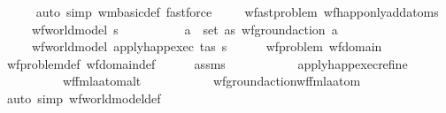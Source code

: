 \begin{isabellebody}
\ \ \ \ \isamarkupfalse%
\ {\isacharparenleft}{\kern0pt}auto\ simp{\isacharcolon}{\kern0pt}\ wm{\isacharunderscore}{\kern0pt}basic{\isacharunderscore}{\kern0pt}def{\isacharparenright}{\kern0pt}\ fastforce%
\endisatagproof
{\isafoldproof}%
%
\isadelimproof
\isanewline
%
\endisadelimproof
\isanewline
\ \ \isamarkupfalse%
\ {\isacharparenleft}{\kern0pt}\ wf{\isacharunderscore}{\kern0pt}ast{\isacharunderscore}{\kern0pt}problem{\isacharparenright}{\kern0pt}\ wf{\isacharunderscore}{\kern0pt}happ{\isacharunderscore}{\kern0pt}only{\isacharunderscore}{\kern0pt}add{\isacharunderscore}{\kern0pt}atoms{\isacharprime}{\kern0pt}{\isacharcolon}{\kern0pt}\isanewline
\ \ \ \ \ {\isachardoublequoteopen}wf{\isacharunderscore}{\kern0pt}world{\isacharunderscore}{\kern0pt}model\ s{\isachardoublequoteclose}\ \isanewline
\ \ \ \ \ \ \ \ \ {\isachardoublequoteopen}{\isasymforall}a\ {\isasymin}\ set\ as{\isachardot}{\kern0pt}\ wf{\isacharunderscore}{\kern0pt}ground{\isacharunderscore}{\kern0pt}action\ a{\isachardoublequoteclose}\isanewline
\ \ \ \ \ {\isachardoublequoteopen}wf{\isacharunderscore}{\kern0pt}world{\isacharunderscore}{\kern0pt}model\ {\isacharparenleft}{\kern0pt}apply{\isacharunderscore}{\kern0pt}happ{\isacharunderscore}{\kern0pt}exec\ {\isacharparenleft}{\kern0pt}t{\isacharcomma}{\kern0pt}as{\isacharparenright}{\kern0pt}\ s{\isacharparenright}{\kern0pt}{\isachardoublequoteclose}\isanewline
%
\isadelimproof
\ \ \ \ %
\endisadelimproof
%
\isatagproof
{}\isamarkupfalse%
\ wf{\isacharunderscore}{\kern0pt}problem\ wf{\isacharunderscore}{\kern0pt}domain\isanewline
\ \ \ \ \isamarkupfalse%
\ wf{\isacharunderscore}{\kern0pt}problem{\isacharunderscore}{\kern0pt}def\ wf{\isacharunderscore}{\kern0pt}domain{\isacharunderscore}{\kern0pt}def\isanewline
\ \ \ \ \isamarkupfalse%
\ assms\ \isanewline
\ \ \ \ \ \ \ \ \ \ apply{\isacharunderscore}{\kern0pt}happ{\isacharunderscore}{\kern0pt}exec{\isacharunderscore}{\kern0pt}refine\ \isanewline
\ \ \ \ \ \ \ \ \ \ wf{\isacharunderscore}{\kern0pt}fmla{\isacharunderscore}{\kern0pt}atom{\isacharunderscore}{\kern0pt}alt\ \isanewline
\ \ \ \ \ \ \ \ \ \ wf{\isacharunderscore}{\kern0pt}ground{\isacharunderscore}{\kern0pt}action{\isacharunderscore}{\kern0pt}wf{\isacharunderscore}{\kern0pt}fmla{\isacharunderscore}{\kern0pt}atom\isanewline
\ \ \ \ \isamarkupfalse%
\ {\isacharparenleft}{\kern0pt}auto\ simp{\isacharcolon}{\kern0pt}\ wf{\isacharunderscore}{\kern0pt}world{\isacharunderscore}{\kern0pt}model{\isacharunderscore}{\kern0pt}def{\isacharparenright}{\kern0pt}%

\end{isabellebody}
